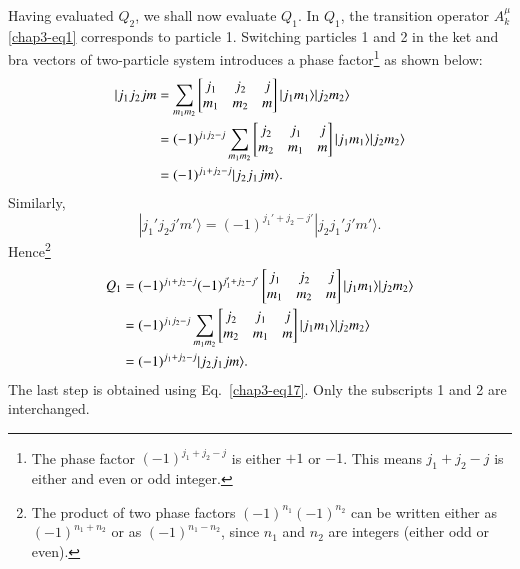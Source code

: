 Having evaluated $Q_2$, we shall now evaluate $Q_1$. In $Q_1$, the transition operator $A_k^\mu$ \eqref{chap3-eq1} corresponds to particle 1. Switching particles 1 and 2 in the ket and bra vectors of two-particle system introduces a phase factor\footnote{The phase factor $(-1)^{j_1 +j_2-j}$ is either $+1$ or $-1$. This means $j_1 + j_2-j$ is either and even or odd integer.}  as shown below:
\begin{align}
| j_1 j_2 j m 
& = \sum_{m_1m_2} \begin{bmatrix}j_1 & j_2 & j\\m_1 & m_2 & m\end{bmatrix} |j_1 m_1 \rangle| j_2 m_2\rangle \notag \\
& = (-1)^{j_1 j_2-j} \sum_{m_1 m_2} 
	\begin{bmatrix}j_2 & j_1 & j\\m_2 & m_1 & m \end{bmatrix} |j_1 m_1 \rangle | j_2 m_2 \rangle \notag \\
& = (-1)^{j_1 + j_2-j} | j_2 j_1 j m \rangle .\label{chap3-eq19}
\end{align}
Similarly,
\begin{equation}
|j_1' j_2 j' m' \rangle = (-1)^{j_1' + j_2 - j'} | j_2 j_1' j' m' \rangle . \label{chap3-eq20}
\end{equation}
Hence\footnote{The product of two phase factors $(-1)^{n_1} (-1)^{n_2}$ can be written either as $(-1)^{n_1 + n_2}$ or as $(-1)^{n_1-n_2}$, since $n_1$ and $n_2$ are integers (either odd or even).}
\begin{align}
Q_1 & = (-1)^{j_1 + j_2 -j} (-1)^{j_1' + j_2 -j' }
	\begin{bmatrix}j_1 & j_2 & j\\m_1 & m_2 & m\end{bmatrix} | j_1 m_1 \rangle | j_2 m_2 \rangle \notag \\
& = (-1)^{j_1 j_2-j} \sum_{m_1 m_2}
\begin{bmatrix}j_2 & j_1 & j\\m_2 & m_1 & m\end{bmatrix} | j_1 m_1 \rangle | j_2 m_2 \rangle \notag \\
& = (-1)^{j_1+j_2-j} | j_2 j_1 jm \rangle. \label{chap3-eq21}
\end{align}
The last step is obtained using Eq.\ \eqref{chap3-eq17}. Only the subscripts 1 and 2 are interchanged. 

